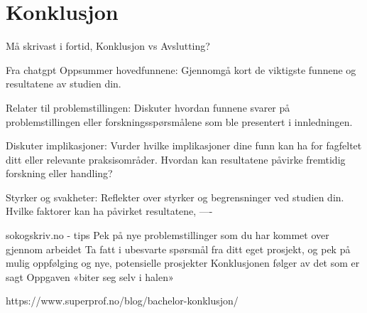 \chapter{Konklusjon}
\thispagestyle{fancy}
Må skrivast i fortid, Konklusjon vs Avslutting?

Fra chatgpt
Oppsummer hovedfunnene: Gjennomgå kort de viktigste funnene og resultatene av studien din.

Relater til problemstillingen: Diskuter hvordan funnene svarer på problemstillingen eller forskningsspørsmålene 
som ble presentert i innledningen.

Diskuter implikasjoner: Vurder hvilke implikasjoner dine funn kan ha for fagfeltet ditt eller relevante praksisområder. 
Hvordan kan resultatene påvirke fremtidig forskning eller handling?

Styrker og svakheter: Reflekter over styrker og begrensninger ved studien din. 
Hvilke faktorer kan ha påvirket resultatene,
----

sokogskriv.no - tips
Pek på nye problemstillinger som du har kommet over gjennom arbeidet
Ta fatt i ubesvarte spørsmål fra ditt eget prosjekt, og pek på mulig oppfølging og nye, potensielle prosjekter
Konklusjonen følger av det som er sagt
Oppgaven «biter seg selv i halen»

https://www.superprof.no/blog/bachelor-konklusjon/